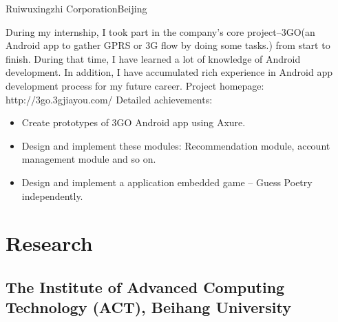 \documentclass[zh,color,11pt,a4paper,sans]{moderncv} %
\begin{document}
	

{Ruiwuxingzhi Corporation}{Beijing}{}{During my internship, I took part in the company's core project--3GO(an Android app to gather GPRS or 3G flow by doing some tasks.) from start to finish. During that time, I have learned a lot of knowledge of Android development. In addition, I have accumulated rich experience in Android app development process for my future career.
	\newline{}Project homepage: http://3go.3gjiayou.com/
	\newline{}
	Detailed achievements:
	\begin{itemize}
	\item Create prototypes of 3GO Android app using Axure.
	\item Design and implement these modules: Recommendation module, account management module and so on.
	\item Design and implement a application embedded game -- Guess Poetry independently.
	\end{itemize}}


\section{Research}

\subsection{The Institute of Advanced Computing Technology (ACT), Beihang University}

\end{document}
